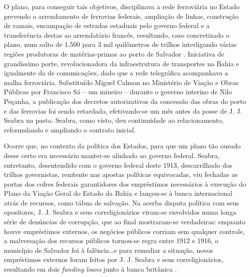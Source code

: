 O plano, para conseguir tais objetivos, disciplinava a rede ferroviária no Estado prevendo o arrendamento de ferrovias federais, ampliação de linhas, construção de ramais, encampação de estradas estaduais pelo governo federal e a transferência destas ao arrendatário francês, resultando, caso concretizado o plano, num salto de 1.500 para 3 mil quilômetros de trilhos interligando várias regiões produtoras de matérias-primas ao porto de Salvador \cite[pp.~217]{joaci_porto_2016}. Iniciativa de grandíssimo porte, revolucionadora da infraestrutura de transportes na Bahia e igualmente da de comunicações, dado que a rede telegráfica acompanhava a malha ferroviária. Substituído Miguel Calmon no Ministério de Viação e Obras Públicas por Francisco Sá -- um mineiro --  durante o governo interino de Nilo Peçanha, a publicação dos decretos autorizativos da concessão das obras do porto e das ferrovias foi sendo retardada, efetivando-se um mês antes da posse de J. J. Seabra na pasta. Seabra, como visto, deu continuidade ao relacionamento, reformulando e ampliando o contrato inicial.

Ocorre que, no contexto da política dos Estados, para que um plano tão ousado desse certo era necessário manter-se alinhado ao governo federal. Seabra, entretanto, desentendido com o governo federal deste 1913, descarrilhado dos trilhos governistas, renitente nas apostas políticas equivocadas, viu fechadas as portas dos cofres federais garantidores dos empréstimos necessários à execução do Plano da Viação Geral do Estado da Bahia e lançou-se à banca internacional atrás de recursos, como tábua de salvação. Na acerba disputa política com seus opositores, J. J. Seabra e seus correligionários viram-se envolvidos numa longa série de denúncias de corrupção, que ao final mostraram-se verdadeiras: enquanto houve empréstimos externos, os negócios públicos corriam sem qualquer controle, a malversação dos recursos públicos tornou-se regra entre 1912 e 1916, o município de Salvador foi à falência\dots e para remediar a situação, novos empréstimos externos foram feitos por J. J. Seabra e seus correligionários, resultando em dois \textit{funding loans} junto à banca britânica \cite[pp.~217-221]{joaci_porto_2016}.

